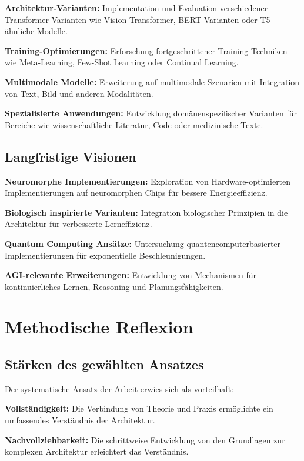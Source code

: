 \textbf{Architektur-Varianten:} Implementation und Evaluation verschiedener Transformer-Varianten wie Vision Transformer, BERT-Varianten oder T5-ähnliche Modelle.

\textbf{Training-Optimierungen:} Erforschung fortgeschrittener Training-Techniken wie Meta-Learning, Few-Shot Learning oder Continual Learning.

\textbf{Multimodale Modelle:} Erweiterung auf multimodale Szenarien mit Integration von Text, Bild und anderen Modalitäten.

\textbf{Spezialisierte Anwendungen:} Entwicklung domänenspezifischer Varianten für Bereiche wie wissenschaftliche Literatur, Code oder medizinische Texte.

\subsection{Langfristige Visionen}

\textbf{Neuromorphe Implementierungen:} Exploration von Hardware-optimierten Implementierungen auf neuromorphen Chips für bessere Energieeffizienz.

\textbf{Biologisch inspirierte Varianten:} Integration biologischer Prinzipien in die Architektur für verbesserte Lerneffizienz.

\textbf{Quantum Computing Ansätze:} Untersuchung quantencomputerbasierter Implementierungen für exponentielle Beschleunigungen.

\textbf{AGI-relevante Erweiterungen:} Entwicklung von Mechanismen für kontinuierliches Lernen, Reasoning und Planungsfähigkeiten.

\section{Methodische Reflexion}

\subsection{Stärken des gewählten Ansatzes}

Der systematische Ansatz der Arbeit erwies sich als vorteilhaft:

\textbf{Vollständigkeit:} Die Verbindung von Theorie und Praxis ermöglichte ein umfassendes Verständnis der Architektur.

\textbf{Nachvollziehbarkeit:} Die schrittweise Entwicklung von den Grundlagen zur komplexen Architektur erleichtert das Verständnis.

